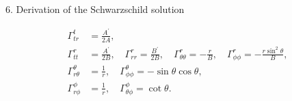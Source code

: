 \documentclass[11pt]{article}
\begin{document}
\begin{problem}{6. Derivation of the Schwarzschild solution}
\begin{enumerate}[label=(\alph*)]
\begin{answer}
            \begin{equation}
            \label{eq:p6-christoffels}
            \begin{aligned}
              \Gamma_{tr}^t &= \frac{A^{\prime}}{2A}, \\
              \Gamma_{tt}^r &= \frac{A^{\prime}}{2B}, \quad \Gamma_{rr}^r = \frac{B^{\prime}}{2B}, \quad \Gamma_{\theta\theta}^r = - \frac{r}{B}, \quad \Gamma_{\phi\phi}^r = -\frac{r\sin^2\theta}{B}, \\
              \Gamma_{r\theta}^{\theta} &= \frac{1}{r}, \quad \Gamma_{\phi\phi}^{\theta} = -\sin\theta\cos\theta, \\
              \Gamma_{r\phi}^{\phi} &= \frac{1}{r}, \quad \Gamma_{\theta\phi}^{\phi} = \cot\theta.
            \end{aligned}
          \end{equation}


\end{answer}
\end{enumerate}
\end{problem}
\end{document}
